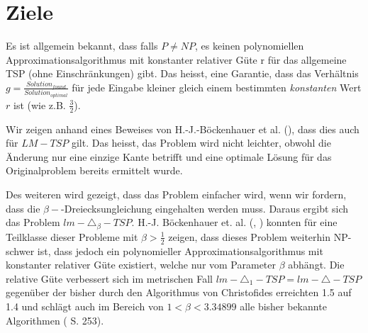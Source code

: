 \documentclass[a4paper,11pt]{scrreprt}
\begin{document}
\begin{description}
%
%
%

\end{description}

\section{Ziele}

Es ist allgemein bekannt, dass falls $P \not= NP$, es keinen polynomiellen Approximationsalgorithmus mit konstanter relativer Güte r für das allgemeine TSP (ohne Einschränkungen) gibt. Das heisst, eine Garantie, dass das Verhältnis $g = \frac{Solution_{found}}{Solution_{optimal}}$ für jede Eingabe kleiner gleich einem bestimmten \emph{konstanten} Wert $r$ ist (wie z.B. $\frac{3}{2}$).

Wir zeigen anhand eines Beweises von H.-J.-Böckenhauer et al. (\cite{bok1}), dass dies auch für $LM-TSP$ gilt. Das heisst, das Problem wird nicht leichter, obwohl die Änderung nur eine einzige Kante betrifft und eine optimale Lösung für das Originalproblem bereits ermittelt wurde.

Des weiteren wird gezeigt, dass das Problem einfacher wird, wenn wir fordern, dass die $\beta-$-Dreiecksungleichung eingehalten werden muss. Daraus ergibt sich das Problem $lm-\triangle_\beta-TSP$. H.-J. Böckenhauer et. al. (\cite{bok1}, \cite{bok2}) konnten für eine Teilklasse dieser Probleme mit $\beta > \frac{1}{2}$ zeigen, dass dieses Problem weiterhin NP-schwer ist, dass jedoch ein polynomieller Approximationsalgorithmus mit konstanter relativer Güte existiert, welche nur vom Parameter $\beta$ abhängt. Die relative Güte verbessert sich im metrischen Fall $lm-\triangle_1-TSP = lm-\triangle-TSP$ gegenüber der bisher durch den Algorithmus von Christofides erreichten 1.5 auf 1.4 und schlägt auch im Bereich von $1 < \beta < 3.34899$ alle bisher bekannte Algorithmen (\cite{bok1} S. 253).
\end{document}
